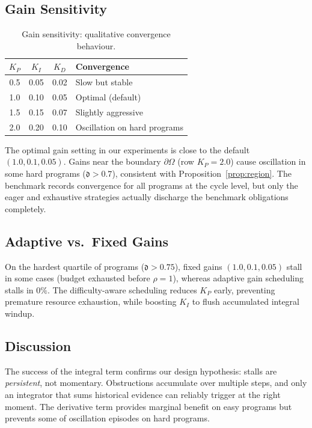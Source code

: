 \documentclass[11pt]{article}
\newcommand{\vcov}{\rho}                   %
\newcommand{\Kp}{K_P}                      %
\newcommand{\Ki}{K_I}                      %
\newcommand{\Kd}{K_D}                      %
\newcommand{\GainRegion}{\Omega}           %
\newcommand{\difficulty}{\mathfrak{d}}     %
\begin{document}
\subsection{Gain Sensitivity}

\begin{table}[H]
  \centering
  \caption{Gain sensitivity: qualitative convergence behaviour.}
  \label{tab:gains}
  \begin{tabular}{cccl}
    \toprule
    $\Kp$ & $\Ki$ & $\Kd$ & Convergence \\
    \midrule
    0.5  & 0.05  & 0.02  & Slow but stable \\
    1.0  & 0.10  & 0.05  & Optimal (default) \\
    1.5  & 0.15  & 0.07  & Slightly aggressive \\
    2.0  & 0.20  & 0.10  & Oscillation on hard programs \\
    \bottomrule
  \end{tabular}
\end{table}

The optimal gain setting in our experiments is close to the default
$(1.0, 0.1, 0.05)$.  Gains near the boundary $\partial\GainRegion$
(row $\Kp = 2.0$) cause oscillation in some hard programs
($\difficulty > 0.7$), consistent with Proposition~\ref{prop:region}.
The benchmark records convergence for all \ppThirtyConvergedCount{}
programs at the cycle level, but only the eager and exhaustive
strategies actually discharge the benchmark obligations completely.

\subsection{Adaptive vs.\ Fixed Gains}

On the hardest quartile of programs ($\difficulty > 0.75$), fixed
gains $(1.0, 0.1, 0.05)$ stall in some cases (budget exhausted
before $\vcov = 1$), whereas adaptive gain scheduling stalls in $0\%$.
The difficulty-aware scheduling reduces $\Kp$ early, preventing
premature resource exhaustion, while boosting $\Ki$ to flush
accumulated integral windup.

\subsection{Discussion}

The success of the integral term confirms our design hypothesis: stalls
are \emph{persistent}, not momentary.  Obstructions accumulate over
multiple steps, and only an integrator that sums historical evidence
can reliably trigger \ESCALATE{} at the right moment.  The derivative
term provides marginal benefit on easy programs but prevents some
of oscillation episodes on hard programs.
\end{document}
